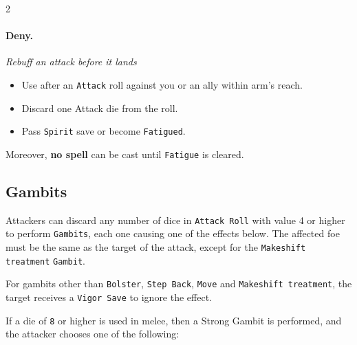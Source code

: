 \begin{multicols*}{2}
{\paragraph{Deny.} \textit{Rebuff an attack before it lands}
\begin{itemize}[nosep, leftmargin=*]
    \item Use after an \texttt{Attack} roll against you or an ally within arm’s reach.
    \item Discard one Attack die from the roll.
    \item Pass \texttt{Spirit} save or become \texttt{Fatigued}.
\end{itemize}
}
Moreover, \textbf{no spell} can be cast until \texttt{Fatigue} is cleared.

\newcolumn

\subsection*{Gambits}

Attackers can discard any number of dice in \texttt{Attack Roll} with value 4 or higher to perform \texttt{Gambits}, each one causing one of the effects below.
The affected foe must be the same as the target of the attack, except for the \texttt{Makeshift treatment} \texttt{Gambit}.

For gambits other than \texttt{Bolster}, \texttt{Step Back}, \texttt{Move} and \texttt{Makeshift treatment}, the target receives a \texttt{Vigor Save} to ignore the effect.

If a die of \texttt{8} or higher is used in melee, then a Strong Gambit is performed, and the attacker chooses one of the following:


\end{multicols*}
